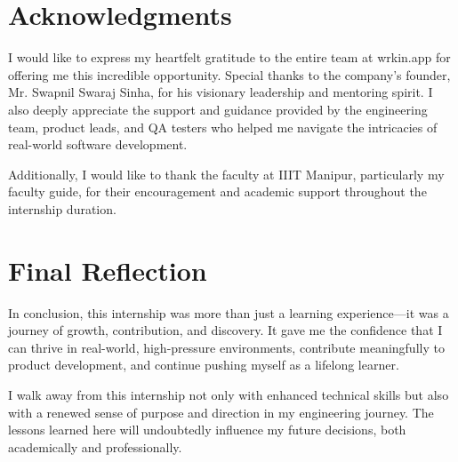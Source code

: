 \section{Acknowledgments}

I would like to express my heartfelt gratitude to the entire team at wrkin.app for offering me this incredible opportunity. Special thanks to the company’s founder, Mr. Swapnil Swaraj Sinha, for his visionary leadership and mentoring spirit. I also deeply appreciate the support and guidance provided by the engineering team, product leads, and QA testers who helped me navigate the intricacies of real-world software development.

Additionally, I would like to thank the faculty at IIIT Manipur, particularly my faculty guide, for their encouragement and academic support throughout the internship duration.

\section{Final Reflection}

In conclusion, this internship was more than just a learning experience—it was a journey of growth, contribution, and discovery. It gave me the confidence that I can thrive in real-world, high-pressure environments, contribute meaningfully to product development, and continue pushing myself as a lifelong learner.

I walk away from this internship not only with enhanced technical skills but also with a renewed sense of purpose and direction in my engineering journey. The lessons learned here will undoubtedly influence my future decisions, both academically and professionally.
